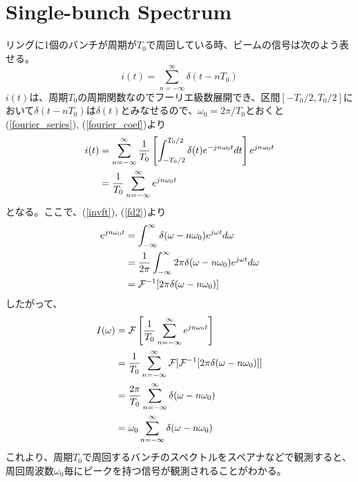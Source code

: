 \documentclass[]{jlreq}
\theoremstyle{definition}
\begin{document}
\section{Single-bunch Spectrum}
リングに1個のバンチが周期が$T_0$で周回している時、ビームの信号は次のよう表せる。
%
\begin{equation}
  i(t) = \sum_{n=-\infty}^{\infty} \delta (t - n T_0 )
\end{equation}
%
$i(t)$は、周期$T_0$の周期関数なのでフーリエ級数展開でき、区間$[-T_0/2, T_0/2]$において$\delta(t- n T_0)$は$\delta(t)$とみなせるので、$\omega_0 = 2\pi/T_0$とおくと(\ref{fourier_series}), (\ref{fourier_coef})より
%
\begin{align}
  i(t) &= \sum_{n = -\infty}^{\infty} \frac{1}{T_0} \left[\int_{-T_0/2}^{T_0/2}\delta (t) e^{-j n \omega_0 t} dt\right] 
  e^{j n \omega_0 t} \notag\\
              &= \frac{1}{T_0} \sum_{n = -\infty}^{\infty} e^{j n \omega_0 t} 
\end{align}
%
となる。ここで、(\ref{invft}), (\ref{fd2})より
%
\begin{align}
  e^{j n \omega_0 t} &=  \int_{-\infty}^{\infty} \delta (\omega - n \omega_0) e^{j \omega t} d\omega \notag\\ 
      &= \frac{1}{2\pi} \int_{-\infty}^{\infty} 2\pi \delta (\omega - n \omega_0) e^{j \omega t} d\omega\notag \\ 
      &= \mathcal{F}^{-1}[2\pi \delta(\omega - n\omega_0)] 
\end{align}
%
したがって、
%
\begin{align}
  I(\omega) &= \mathcal{F}\left[\frac{1}{T_0} \sum_{n = -\infty}^{\infty} e^{j n \omega_0 t}\right] \notag\\ 
      & = \frac{1}{T_0} \sum_{n = -\infty}^{\infty} \mathcal{F}[\mathcal{F}^{-1}[2\pi \delta(\omega - n\omega_0)]] \notag\\ 
      & = \frac{2 \pi}{T_0} \sum_{n = -\infty}^{\infty} \delta(\omega - n\omega_0)\notag\\ 
      &= \omega_0 \sum_{n = -\infty}^{\infty} \delta(\omega - n\omega_0)
\end{align}
%
これより、周期$T_0$で周回するバンチのスペクトルをスペアナなどで観測すると、周回周波数$\omega_0$毎にピークを持つ信号が観測されることがわかる。
%
\end{document}
